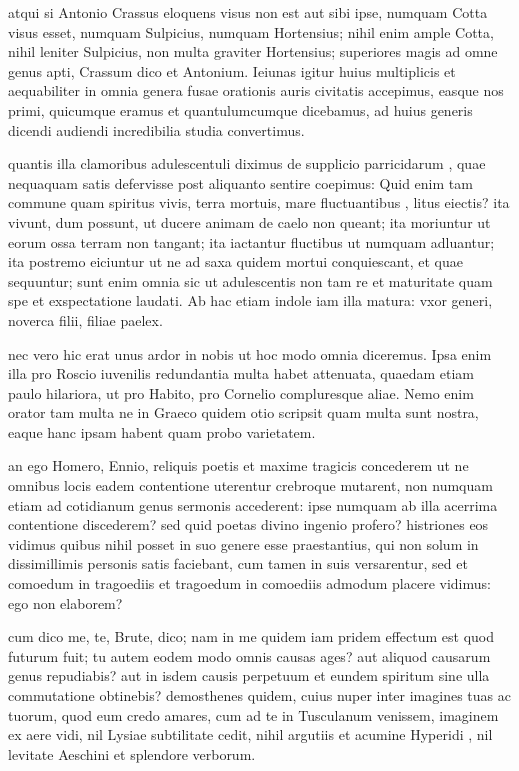  atqui si Antonio Crassus eloquens visus non est aut sibi ipse, numquam Cotta visus esset, numquam Sulpicius, numquam Hortensius; nihil enim ample Cotta, nihil leniter Sulpicius, non multa graviter Hortensius; superiores magis ad omne genus apti, Crassum dico et Antonium. Ieiunas igitur huius multiplicis et aequabiliter in omnia genera fusae orationis auris civitatis accepimus, easque nos primi, quicumque eramus et quantulumcumque dicebamus, ad huius generis dicendi audiendi incredibilia studia convertimus.

 quantis illa clamoribus adulescentuli diximus de supplicio parricidarum , quae nequaquam satis defervisse post aliquanto sentire coepimus: Quid enim tam commune quam spiritus vivis, terra mortuis, mare fluctuantibus , litus eiectis? ita vivunt, dum possunt, ut ducere animam de caelo non queant; ita moriuntur ut eorum ossa terram non tangant; ita iactantur fluctibus ut numquam adluantur; ita postremo eiciuntur ut ne ad saxa quidem mortui conquiescant, et quae sequuntur; sunt enim omnia sic ut adulescentis non tam re et maturitate quam spe et exspectatione laudati. Ab hac etiam indole iam illa matura: vxor generi, noverca filii, filiae paelex.

 nec vero hic erat unus ardor in nobis ut hoc modo omnia diceremus. Ipsa enim illa pro Roscio iuvenilis redundantia multa habet attenuata, quaedam etiam paulo hilariora, ut pro Habito, pro Cornelio compluresque aliae. Nemo enim orator tam multa ne in Graeco quidem otio scripsit quam multa sunt nostra, eaque hanc ipsam habent quam probo varietatem.

 an ego Homero, Ennio, reliquis poetis et maxime tragicis concederem ut ne omnibus locis eadem contentione uterentur crebroque mutarent, non numquam etiam ad cotidianum genus sermonis accederent: ipse numquam ab illa acerrima contentione discederem? sed quid poetas divino ingenio profero? histriones eos vidimus quibus nihil posset in suo genere esse praestantius, qui non solum in dissimillimis personis satis faciebant, cum tamen in suis versarentur, sed et comoedum in tragoediis et tragoedum in comoediis admodum placere vidimus: ego non elaborem?

 cum dico me, te, Brute, dico; nam in me quidem iam pridem effectum est quod futurum fuit; tu autem eodem modo omnis causas ages? aut aliquod causarum genus repudiabis? aut in isdem causis perpetuum et eundem spiritum sine ulla commutatione obtinebis? demosthenes quidem, cuius nuper inter imagines tuas ac tuorum, quod eum credo amares, cum ad te in Tusculanum venissem, imaginem ex aere vidi, nil Lysiae subtilitate cedit, nihil argutiis et acumine Hyperidi , nil levitate Aeschini et splendore verborum.

